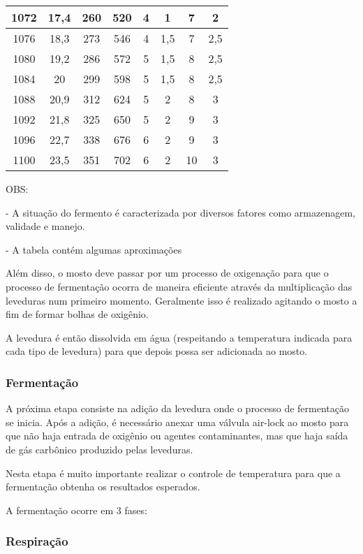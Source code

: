 \begin{table}[h]
\begin{tabular}{|c|c|c|c|c|c|c|c|}
1072 & 17,4 & 260 & 520 & 4 & 1 & 7 & 2 \\ \hline
1076 & 18,3 & 273 & 546 & 4 & 1,5 & 7 & 2,5 \\ \hline
1080 & 19,2 & 286 & 572 & 5 & 1,5 & 8 & 2,5 \\ \hline
1084 & 20 & 299 & 598 & 5 & 1,5 & 8 & 2,5 \\ \hline
1088 & 20,9 & 312 & 624 & 5 & 2 & 8 & 3 \\ \hline
1092 & 21,8 & 325 & 650 & 5 & 2 & 9 & 3 \\ \hline
1096 & 22,7 & 338 & 676 & 6 & 2 & 9 & 3 \\ \hline
1100 & 23,5 & 351 & 702 & 6 & 2 & 10 & 3 \\ \hline
\end{tabular}
\end{table}

OBS:

- A situação do fermento é caracterizada por diversos fatores como armazenagem, validade e manejo.

- A tabela contém algumas aproximações


Além disso, o mosto deve passar por um processo de oxigenação para que o processo de fermentação ocorra de maneira eficiente através da multiplicação das leveduras num primeiro momento. Geralmente isso é realizado agitando o mosto a fim de formar bolhas de oxigênio.

A levedura é então dissolvida em água (respeitando a temperatura indicada para cada tipo de levedura) para que depois possa ser adicionada ao mosto.


\subsubsection{Fermentação}

A próxima etapa consiste na adição da levedura onde o processo de fermentação se inicia. Após a adição, é necessário anexar uma válvula air-lock ao mosto para que não haja entrada de oxigênio ou agentes contaminantes, mas que haja saída de gás carbônico produzido pelas leveduras.

Nesta etapa é muito importante realizar o controle de temperatura para que a fermentação obtenha os resultados esperados.

A fermentação ocorre em 3 fases:

\subsubsection{Respiração}

